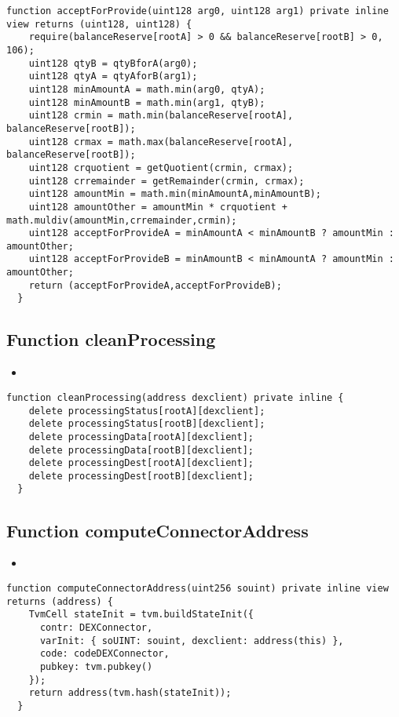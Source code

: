 \begin{lstlisting}[firstnumber=214]
  function acceptForProvide(uint128 arg0, uint128 arg1) private inline view returns (uint128, uint128) {
    require(balanceReserve[rootA] > 0 && balanceReserve[rootB] > 0, 106);
    uint128 qtyB = qtyBforA(arg0);
    uint128 qtyA = qtyAforB(arg1);
    uint128 minAmountA = math.min(arg0, qtyA);
    uint128 minAmountB = math.min(arg1, qtyB);
    uint128 crmin = math.min(balanceReserve[rootA], balanceReserve[rootB]);
    uint128 crmax = math.max(balanceReserve[rootA], balanceReserve[rootB]);
    uint128 crquotient = getQuotient(crmin, crmax);
    uint128 crremainder = getRemainder(crmin, crmax);
    uint128 amountMin = math.min(minAmountA,minAmountB);
    uint128 amountOther = amountMin * crquotient + math.muldiv(amountMin,crremainder,crmin);
    uint128 acceptForProvideA = minAmountA < minAmountB ? amountMin : amountOther;
    uint128 acceptForProvideB = minAmountB < minAmountA ? amountMin : amountOther;
    return (acceptForProvideA,acceptForProvideB);
  }
\end{lstlisting}

\subsection{Function cleanProcessing}

\begin{itemize}
\item \issueInternal
\end{itemize}

\begin{lstlisting}[firstnumber=232]
  function cleanProcessing(address dexclient) private inline {
    delete processingStatus[rootA][dexclient];
    delete processingStatus[rootB][dexclient];
    delete processingData[rootA][dexclient];
    delete processingData[rootB][dexclient];
    delete processingDest[rootA][dexclient];
    delete processingDest[rootB][dexclient];
  }
\end{lstlisting}

\subsection{Function computeConnectorAddress}

\begin{itemize}
\item \issueInternal
\end{itemize}

\begin{lstlisting}[firstnumber=95]
  function computeConnectorAddress(uint256 souint) private inline view returns (address) {
    TvmCell stateInit = tvm.buildStateInit({
      contr: DEXConnector,
      varInit: { soUINT: souint, dexclient: address(this) },
      code: codeDEXConnector,
      pubkey: tvm.pubkey()
    });
    return address(tvm.hash(stateInit));
  }
\end{lstlisting}

